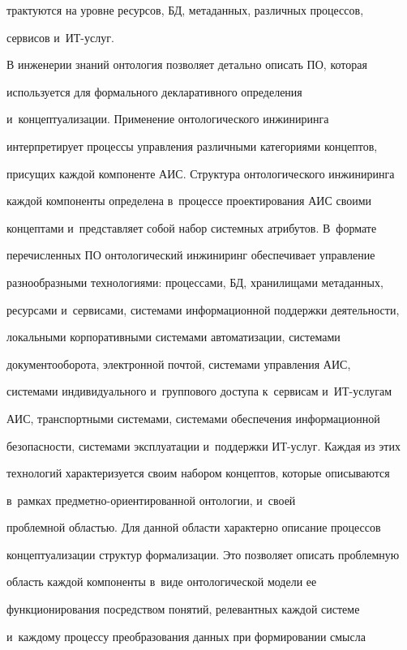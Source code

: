 трактуются на уровне ресурсов, БД, метаданных, различных процессов, 


сервисов и~ИТ-услуг.


  


  В инженерии знаний онтология позволяет детально описать ПО, которая 


используется для формального декларативного определения 


и~концептуализации. Применение онтологического инжиниринга 


интерпретирует процессы управления различными категориями концептов, 


присущих каждой компоненте АИС. Структура онтологического инжиниринга 


каждой компоненты определена в~процессе проектирования АИС своими 


концептами и~представляет собой набор системных атрибутов. В~формате 


перечисленных ПО онтологический инжиниринг обеспечивает управление 


разнообразными технологиями: процессами, БД, хранилищами метаданных, 


ресурсами и~сервисами, системами информационной поддержки деятельности, 


локальными корпоративными системами автоматизации, системами 


документооборота, электронной почтой, системами управления АИС, 


системами индивидуального и~группового доступа к~сервисам и~ИТ-услу\-гам 


АИС, транспортными системами, системами обеспечения информационной 


безопасности, системами эксплуатации и~поддержки ИТ-услуг. Каждая из этих 


технологий характеризуется своим набором концептов, которые описываются 


в~рамках пред\-мет\-но-ори\-ен\-ти\-ро\-ван\-ной онтологии, и~своей 


проблемной областью. Для данной области характерно описание процессов 


концептуализации структур формализации. Это позволяет описать проблемную 


область каждой компоненты в~виде онтологической модели ее 


функционирования посредством понятий, релевантных каждой системе 


и~каждому процессу преобразования данных при формировании смысла 


